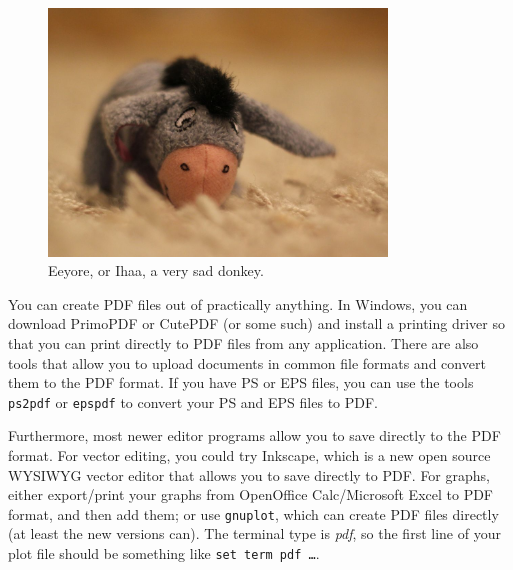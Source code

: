\begin{figure}[ht]
  \begin{center}
    \includegraphics[width=9cm]{images/ihaa.jpg}
    \caption{Eeyore, or Ihaa, a very sad donkey.}
    \label{fig:eeyore}
  \end{center}
\end{figure}

You can create PDF files out of practically anything.  In Windows, you
can download PrimoPDF or CutePDF (or some such) and install a printing
driver so that you can print directly to PDF files from any
application. There are also tools that allow you to upload documents
in common file formats and convert them to the PDF format.  If you
have PS or EPS files, you can use the tools \texttt{ps2pdf} or
\texttt{epspdf} to convert your PS and EPS files to PDF\@.



Furthermore, most newer editor programs allow you to save directly to the PDF
format. For vector editing, you could try Inkscape, which is a new open source
WYSIWYG vector editor that allows you to save directly to PDF\@. 
For graphs, either export/print your graphs from OpenOffice Calc/Microsoft
Excel to PDF format, and then add them; or use \texttt{gnuplot}, which can
create PDF files directly (at least the new versions can).
The terminal type is \emph{pdf}, so the first line of your plot file should be
something like \texttt{set term pdf \ldots}.

